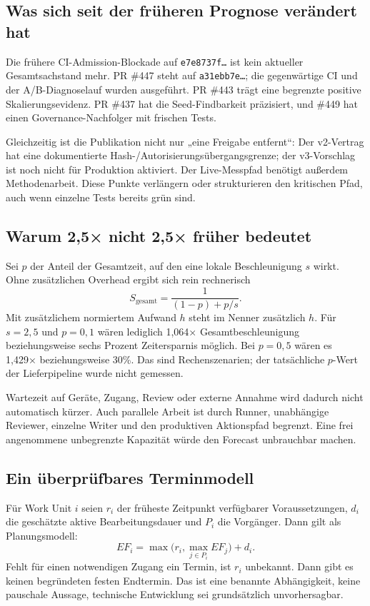 \begin{cols}
\subsection*{Was sich seit der früheren Prognose verändert hat}
Die frühere CI-Admission-Blockade auf \texttt{e7e8737f…} ist kein aktueller Gesamtsachstand mehr. PR \#447 steht auf \texttt{a31ebb7e…}; die gegenwärtige CI und der A/B-Diagnoselauf wurden ausgeführt. PR \#443 trägt eine begrenzte positive Skalierungsevidenz. PR \#437 hat die Seed-Findbarkeit präzisiert, und \#449 hat einen Governance-Nachfolger mit frischen Tests. 

Gleichzeitig ist die Publikation nicht nur „eine Freigabe entfernt“: Der v2-Vertrag hat eine dokumentierte Hash-/Autorisierungsübergangsgrenze; der v3-Vorschlag ist noch nicht für Produktion aktiviert. Der Live-Messpfad benötigt außerdem Methodenarbeit. Diese Punkte verlängern oder strukturieren den kritischen Pfad, auch wenn einzelne Tests bereits grün sind. 

\subsection*{Warum 2,5× nicht 2,5× früher bedeutet}
Sei $p$ der Anteil der Gesamtzeit, auf den eine lokale Beschleunigung $s$ wirkt. Ohne zusätzlichen Overhead ergibt sich rein rechnerisch
\[
 S_{\mathrm{gesamt}}=\frac{1}{(1-p)+p/s}.
\]
Mit zusätzlichem normiertem Aufwand $h$ steht im Nenner zusätzlich $h$. Für $s=2{,}5$ und $p=0{,}1$ wären lediglich 1,064× Gesamtbeschleunigung beziehungsweise sechs Prozent Zeitersparnis möglich. Bei $p=0{,}5$ wären es 1,429× beziehungsweise 30\%. Das sind Rechenszenarien; der tatsächliche $p$-Wert der Lieferpipeline wurde nicht gemessen. 

Wartezeit auf Geräte, Zugang, Review oder externe Annahme wird dadurch nicht automatisch kürzer. Auch parallele Arbeit ist durch Runner, unabhängige Reviewer, einzelne Writer und den produktiven Aktionspfad begrenzt. Eine frei angenommene unbegrenzte Kapazität würde den Forecast unbrauchbar machen.

\subsection*{Ein überprüfbares Terminmodell}
Für Work Unit $i$ seien $r_i$ der früheste Zeitpunkt verfügbarer Voraussetzungen, $d_i$ die geschätzte aktive Bearbeitungsdauer und $P_i$ die Vorgänger. Dann gilt als Planungsmodell:
\[
 EF_i=\max\!\bigl(r_i,\max_{j\in P_i}EF_j\bigr)+d_i.
\]
Fehlt für einen notwendigen Zugang ein Termin, ist $r_i$ unbekannt. Dann gibt es keinen begründeten festen Endtermin. Das ist eine benannte Abhängigkeit, keine pauschale Aussage, technische Entwicklung sei grundsätzlich unvorhersagbar.


\end{cols}
